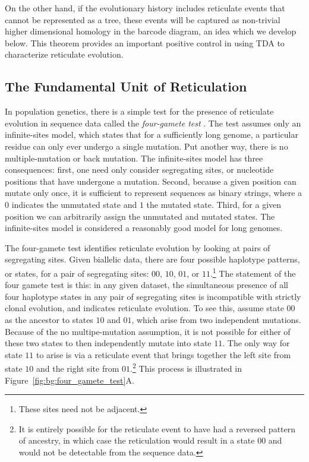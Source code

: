 On the other hand, if the evolutionary history includes reticulate events that cannot be represented as a tree, these events will be captured as non-trivial higher dimensional homology in the barcode diagram, an idea which we develop below.
This theorem provides an important positive control in using TDA to characterize reticulate evolution.

\subsection{The Fundamental Unit of Reticulation}
\label{bg:top4bio:fundamental_unit}

In population genetics, there is a simple test for the presence of reticulate evolution in sequence data called the \emph{four-gamete test} \cite{Hudson:1985}.
The test assumes only an infinite-sites model, which states that for a sufficiently long genome, a particular residue can only ever undergo a single mutation.
Put another way, there is no multiple-mutation or back mutation.
The infinite-sites model has three consequences: first, one need only consider segregating sites, or nucleotide positions that have undergone a mutation.
Second, because a given position can mutate only once, it is sufficient to represent sequences as binary strings, where a $0$ indicates the unmutated state and $1$ the mutated state.
Third, for a given position we can arbitrarily assign the unmutated and mutated states.
The infinite-sites model is considered a reasonably good model for long genomes.

The four-gamete test identifies reticulate evolution by looking at pairs of segregating sites.
Given biallelic data, there are four possible haplotype patterns, or states, for a pair of segregating sites: $00$, $10$, $01$, or $11$.\footnote{These sites need not be adjacent.}
The statement of the four gamete test is this: in any given dataset, the simultaneous presence of all four haplotype states in any pair of segregating sites is incompatible with strictly clonal evolution, and indicates reticulate evolution.
To see this, assume state $00$ as the ancestor to states $10$ and $01$, which arise from two independent mutations.
Because of the no multipe-mutation assumption, it is not possible for either of these two states to then independently mutate into state $11$.
The only way for state $11$ to arise is via a reticulate event that brings together the left site from state $10$ and the right site from $01$.\footnote{It is entirely possible for the reticulate event to have had a reversed pattern of ancestry, in which case the reticulation would result in a state $00$ and would not be detectable from the sequence data.}
This process is illustrated in Figure~\ref{fig:bg:four_gamete_test}A.

